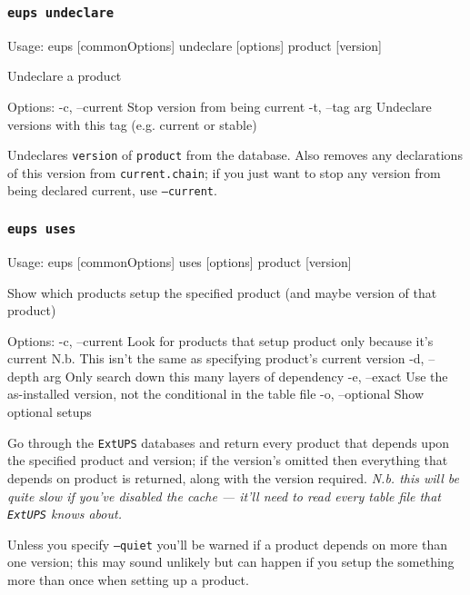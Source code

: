 \documentclass{article}
\newcommand{\code}[1]{\texttt{#1}}
\newcommand{\eups}{\code{ExtUPS}}
\let\overbatim=\verbatim
\let\oendverbatim=\endverbatim
\renewenvironment{verbatim}
{\center\minipage{16cm}\overbatim}
{\oendverbatim\endminipage\endcenter}
\begin{document}

\subsubsection{\code{eups undeclare}}
\begin{verbatim}
Usage:
    eups [commonOptions] undeclare [options] product [version]

Undeclare a product

Options:
   -c, --current           Stop version from being current
   -t, --tag        arg    Undeclare versions with this tag (e.g. current or stable)
\end{verbatim}
  
Undeclares \code{version} of \code{product} from the database. Also
removes any declarations of this version from \code{current.chain}; if
you just want to stop any version from being declared current, use
\code{--current}.


\subsubsection{\code{eups uses}}
\begin{verbatim}
Usage:
    eups [commonOptions] uses [options] product [version]

Show which products setup the specified product (and maybe version of that product)

Options:
   -c, --current           Look for products that setup product only because it's current
                           N.b. This isn't the same as specifying product's current version
   -d, --depth      arg    Only search down this many layers of dependency
   -e, --exact             Use the as-installed version, not the conditional in the table file
   -o, --optional          Show optional setups
\end{verbatim}

Go through the \eups{} databases and return every product that depends upon the specified product and version;
if the version's omitted then everything that depends on product is returned, along with the version
required. \textit{N.b.  this will be quite slow if you've disabled the cache --- it'll need to read every table
  file that \eups{} knows about.}

Unless you specify \code{--quiet} you'll be warned if a product depends on
more than one version;  this may sound unlikely but can happen if you setup
the something more than once when setting up a product.
\end{document}
